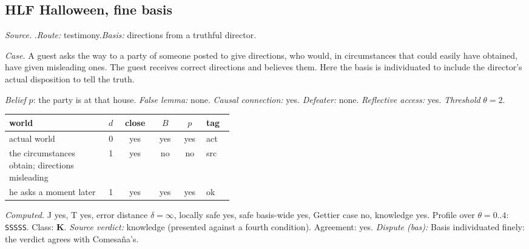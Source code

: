 \subsection*{HLF \enspace Halloween, fine basis}
\noindent\textit{Source.} \citet{Comesana2005}.\quad \textit{Route:} testimony.\quad \textit{Basis:} directions from a truthful director.\par
\noindent\textit{Case.} A guest asks the way to a party of someone posted to give directions, who would, in circumstances that could easily have obtained, have given misleading ones. The guest receives correct directions and believes them. Here the basis is individuated to include the director's actual disposition to tell the truth.\par
\noindent\textit{Belief} $p$: the party is at that house.
 \textit{False lemma:} none. \textit{Causal connection:} yes. \textit{Defeater:} none. \textit{Reflective access:} yes. \textit{Threshold} $\theta = 2$.\par
\begin{center}\begin{tabular}{@{}p{0.43\linewidth}rcccl@{}}
world & $d$ & close & $B$ & $p$ & tag \\ \midrule
actual world & 0 & yes & yes & yes & act \\
the circumstances obtain; directions misleading & 1 & yes & no & no & src \\
he asks a moment later & 1 & yes & yes & yes & ok \\
\end{tabular}\end{center}
\noindent\textit{Computed.} J yes, T yes, error distance $\delta = \infty$, locally safe yes, safe basis-wide yes, Gettier case no, knowledge yes. Profile over $\theta = 0..4$: \texttt{SSSSS}. Class: \textbf{K}.
 \textit{Source verdict:} knowledge (presented against a fourth condition). Agreement: yes.
 \textit{Dispute (bas):} Basis individuated finely: the verdict agrees with Comesa\~na's.
\par\medskip
{}
